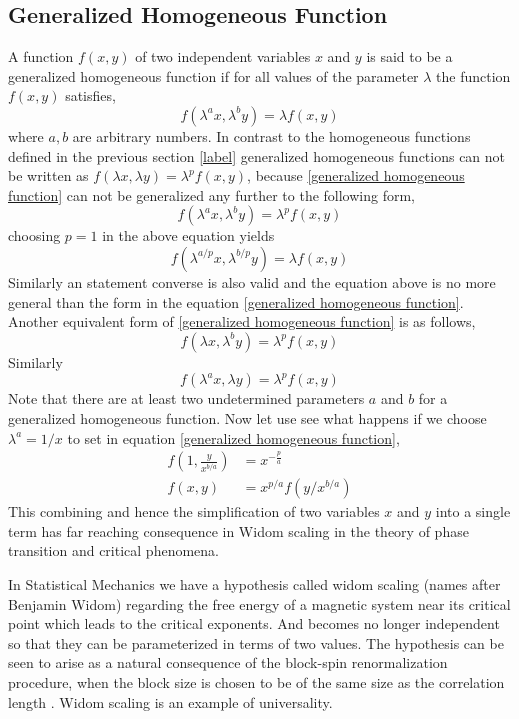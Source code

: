 	
	
	\subsection{Generalized Homogeneous Function}
	A function $f(x,y)$ of two independent variables $x$ and $y$ is said to be a generalized homogeneous function if for all values of the parameter $\lambda$ the function $f(x,y)$ satisfies,
	\begin{equation}
		f(\lambda^a x, \lambda^b y) = \lambda f(x,y)
		\label{generalized homogeneous function}
	\end{equation}
	where $a,b$ are arbitrary numbers. In contrast to the homogeneous functions defined in the previous section \ref{label} generalized homogeneous functions can not be written as $f(\lambda x, \lambda y) = \lambda^p f(x,y)$, because \ref{generalized homogeneous function} can not be generalized any further to the following form,
	\begin{equation}
		f(\lambda^a x, \lambda^b y) = \lambda^p f(x,y)
	\end{equation}
	choosing $p=1$ in the above equation yields
	\begin{equation}
		f(\lambda^{a/p} x, \lambda^{b/p} y) = \lambda f(x,y)
	\end{equation}
	Similarly an statement converse is also valid and the equation above is no more general than the form in the equation \ref{generalized homogeneous function}. Another equivalent form of \ref{generalized homogeneous function}  is as follows,
	\begin{equation}
		f(\lambda x, \lambda^b y) = \lambda^p f(x,y)
	\end{equation}
	Similarly
	\begin{equation}
		f(\lambda^a x, \lambda y) = \lambda^p f(x,y)
	\end{equation}
	Note that there are at least two undetermined parameters $a$ and $b$ for a generalized homogeneous function. Now let use see what happens if we choose $\lambda^a = 1/x$ to set in equation \ref{generalized homogeneous function},
	\begin{align}
		f(1, \frac{y}{x^{b/a}}) &= x^{-\frac{p}{a}} \\
		f(x,y) &= x^{p/a} f(y/x^{b/a})
	\end{align}
	This combining and hence the simplification of two variables $x$ and $y$ into a single term has far reaching consequence in Widom scaling \cite{Kleinert2001, Huang1987, Sabbir}in the theory of phase transition and critical phenomena. 
	
	
	In Statistical Mechanics we have a hypothesis called widom scaling (names after Benjamin Widom)  regarding the free energy of a magnetic system near its critical point which leads to the critical exponents. And becomes no longer independent so that they can be parameterized in terms of two values. The hypothesis can be seen to arise as a natural consequence of the block-spin renormalization procedure, when the block size is chosen to be of the same size as the correlation length \cite{Stanley1987, Kleinert2001, Huang1987}.	Widom scaling is an example of universality.
